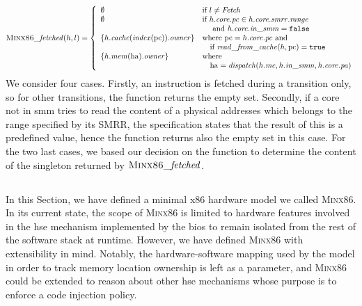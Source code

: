 \[
  \textsc{Minx86}\mathit{\_fetched}(h, l) = \left\{
    \begin{array}{ll}
      \emptyset & \text{if } l \neq \mathit{Fetch} \\
      \emptyset & \text{if } h.\mathit{core}.\mathit{pc} \in
                  h.\mathit{core}.\mathit{smrr}.\mathit{range} \\
                & \quad \text{ and }
                  h.\mathit{core}.\mathit{in\_smm} = \texttt{false} \\
      \{ h.\mathit{cache}(\mathit{index}(\mathrm{pc})).\mathit{owner} \} & \text{where }
                                                                  \mathrm{pc} =
                                                                  h.\mathit{core}.\mathit{pc}
                                                                  \text{ and} \\
                & \quad\text{if }\mathit{read\_from\_cache}(h, \mathrm{pc})
                  = \texttt{true} \\
      \{ h.\mathit{mem}(\mathrm{ha}).\mathit{owner} \} & \text{where } \\
                & \quad\mathrm{ha} =
                  \mathit{dispatch}(h.\mathit{mc},
                  h.\mathit{in\_smm}, h.\mathit{core}.\mathit{pa})

    \end{array}
  \right.
\]
%
We consider four cases.
%
Firstly, an instruction is fetched during a  transition only, so for
other transitions, the function returns the empty set.
%
Secondly, if a core not in \ac{smm} tries to read the content of a physical
addresses which belongs to the range specified by its SMRR, the specification
states that the result of this \IO is a predefined  value, hence the function
returns also the empty set in this case.
%
For the two last cases, we based our decision on the 
function to determine the content of the singleton returned by
\( \textsc{Minx86}\mathit{\_fetched} \).

\subsection*{}

In this Section, we have defined a minimal x86 hardware model we called
{\scshape Minx86}.
%
In its current state, the scope of {\scshape Minx86} is limited to hardware
features involved in the \ac{hse} mechanism implemented by the \ac{bios} to
remain isolated from the rest of the software stack at runtime.
%
However, we have defined {\scshape Minx86} with extensibility in mind.
%
Notably, the hardware-software mapping used by the model in order to track
memory location ownership is left as a parameter, and {\scshape Minx86} could be
extended to reason about other \ac{hse} mechanisms whose purpose is to enforce a
code injection policy.

